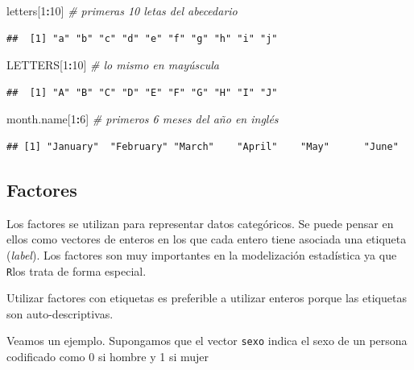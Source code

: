 \documentclass[]{book}
\newenvironment{Shaded}{\begin{snugshade}}{\end{snugshade}}
\newcommand{\CommentTok}[1]{\textcolor[rgb]{0.56,0.35,0.01}{\textit{#1}}}
\newcommand{\DecValTok}[1]{\textcolor[rgb]{0.00,0.00,0.81}{#1}}
\newcommand{\NormalTok}[1]{#1}
\newcommand{\OperatorTok}[1]{\textcolor[rgb]{0.81,0.36,0.00}{\textbf{#1}}}
\begin{document}
\begin{Shaded}
\begin{Highlighting}[]
\NormalTok{letters[}\DecValTok{1}\OperatorTok{:}\DecValTok{10}\NormalTok{]  }\CommentTok{# primeras 10 letas del abecedario}
\end{Highlighting}
\end{Shaded}

\begin{verbatim}
##  [1] "a" "b" "c" "d" "e" "f" "g" "h" "i" "j"
\end{verbatim}

\begin{Shaded}
\begin{Highlighting}[]
\NormalTok{LETTERS[}\DecValTok{1}\OperatorTok{:}\DecValTok{10}\NormalTok{]  }\CommentTok{# lo mismo en mayúscula}
\end{Highlighting}
\end{Shaded}

\begin{verbatim}
##  [1] "A" "B" "C" "D" "E" "F" "G" "H" "I" "J"
\end{verbatim}

\begin{Shaded}
\begin{Highlighting}[]
\NormalTok{month.name[}\DecValTok{1}\OperatorTok{:}\DecValTok{6}\NormalTok{]  }\CommentTok{# primeros 6 meses del año en inglés}
\end{Highlighting}
\end{Shaded}

\begin{verbatim}
## [1] "January"  "February" "March"    "April"    "May"      "June"
\end{verbatim}

\hypertarget{factores}{%
\subsection{Factores}\label{factores}}

Los factores se utilizan para representar datos categóricos. Se
puede pensar en ellos como vectores de enteros en los que cada entero
tiene asociada una etiqueta (\emph{label}). Los factores son muy importantes
en la modelización estadística ya que \texttt{R}los trata de forma especial.

Utilizar factores con etiquetas es preferible a utilizar enteros porque
las etiquetas son auto-descriptivas.

Veamos un ejemplo. Supongamos que el vector \texttt{sexo} indica el sexo de un
persona codificado como 0 si hombre y 1 si mujer
\end{document}

